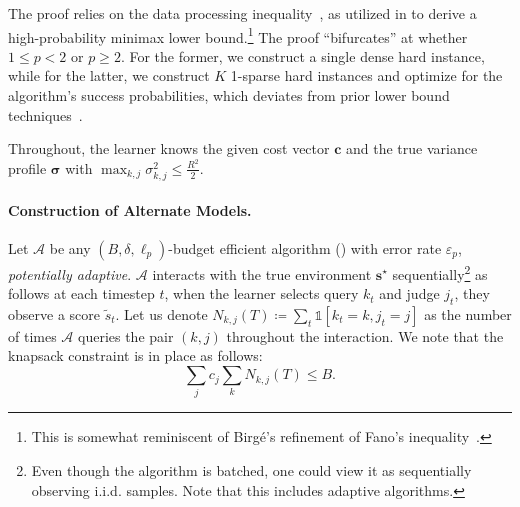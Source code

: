 \documentclass{article}
\def\vc{{\bm{c}}}
\def\vs{{\bm{s}}}
\def\gA{{\mathcal{A}}}
\theoremstyle{plain}
\theoremstyle{definition}
\theoremstyle{plain}
\newcommand{\indicator}{\mathds{1}}
\begin{document}
The proof relies on the data processing inequality~\citep{garivier2019lower}, as utilized in \citet{jedra2023identification} to derive a high-probability minimax lower bound.\footnote{This is somewhat reminiscent of Birg\'{e}'s refinement of Fano's inequality~\citep{tsybakov,gerchinovitz2020fano}.}
The proof ``bifurcates'' at whether $1 \leq p < 2$ or $p \geq 2$.
For the former, we construct a single dense hard instance, while for the latter, we construct $K$ 1-sparse hard instances and optimize for the algorithm's success probabilities, which deviates from prior lower bound techniques~\citep{jedra2023identification}.

Throughout, the learner knows the given cost vector $\vc$ and the true variance profile $\bm\sigma$ with $\max_{k,j} \sigma_{k,j}^2 \leq \frac{R^2}{2}$.


\paragraph{Construction of Alternate Models.}
Let $\gA$ be any $(B, \delta, \ell_p)$-budget efficient algorithm () with error rate $\varepsilon_p$, \emph{potentially adaptive}.
$\gA$ interacts with the true environment $\vs^\star$ sequentially\footnote{Even though the algorithm is batched, one could view it as sequentially observing i.i.d. samples. Note that this includes adaptive algorithms.} as follows at each timestep $t$, when the learner selects query $k_t$ and judge $j_t$, they observe a score $\tilde{s}_t$.
Let us denote $N_{k,j}(T) \coloneq \sum_t \indicator[k_t = k, j_t = j]$ as the number of times $\gA$ queries the pair $(k, j)$ throughout the interaction.
We note that the knapsack constraint is in place as follows:
\begin{equation}
    \sum_j c_j \sum_k N_{k,j}(T) \leq B.
\end{equation}
\end{document}
